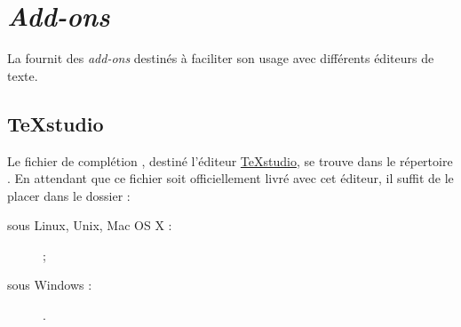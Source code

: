 \chapter{\emph{Add-ons}}\label{cha:add-ons}

La \yatcl{} fournit des \emph{add-ons} destinés à faciliter son usage avec
différents éditeurs de texte.

\section{TeXstudio}
\label{sec:texstudio}

Le fichier de complétion , destiné l'éditeur
\href{http://texstudio.sourceforge.net/}{TeXstudio}, se trouve dans le
répertoire . En attendant
que ce fichier soit officiellement livré avec cet éditeur, il suffit de le
placer dans le dossier :
\begin{description}
\item[sous Linux, Unix, Mac OS X :]  ;
\item[sous Windows :] .
\end{description}

%
\iffalse
\fi
